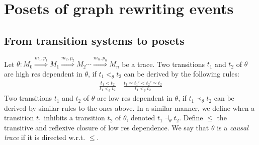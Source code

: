 \section{Posets of graph rewriting events}

\subsection{From transition systems to posets}
\label{sec:concret}

\begin{definition}
  \label{def:causal_trace}
  Let $\theta:M_0\overset{m_1,p_1}{\Rightarrow} M_1\overset{m_2,p_2}{\Rightarrow} M_2 \cdots \overset{m_n,p_n}{\Rightarrow} M_n$ be a trace.
  Two transitions $t_1$ and $t_2$ of $\theta$ are high res dependent in $\theta$, if $t_1<_{\theta} t_2$ can be derived by the following rules:
  \begin{align*}
    \frac{t_1 < t_2}{t_1 <_{\theta} t_2}\quad
    \frac{t_1\simeq t_1'<t_2'\simeq t_2}{t_1 <_{\theta} t_2}
  \end{align*}
  Two transitions $t_1$ and $t_2$ of $\theta$ are low res dependent in $\theta$, if $t_1\prec_{\theta} t_2$ can be derived by similar rules to the ones above. In a similar manner, we define when a transition $t_1$ inhibits a transition $t_2$ of $\theta$, denoted $t_1\dashv_{\theta} t_2$.
  Define $\leq$ the transitive and reflexive closure of low res dependence. We say that $\theta$ is a \emph{causal trace} if it is directed w.r.t. $\leq$.
\end{definition}

